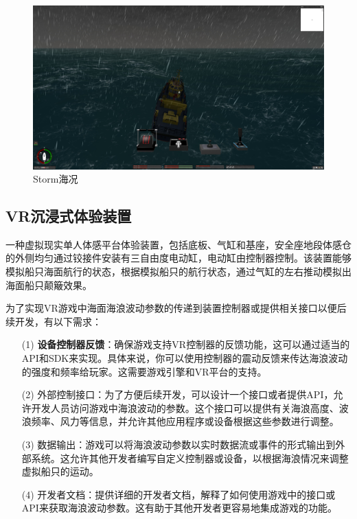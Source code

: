 \documentclass[a4paper,10pt]{article}
\begin{document}
		\begin{figure}[htbp]
			\centering				\includegraphics[width=\columnwidth]{picture/Storm}
			\caption{
				\label{fig: Storm1} 
				Storm海况
			}	
		\end{figure}
		
		\subsection{VR沉浸式体验装置}
		
		一种虚拟现实单人体感平台体验装置，包括底板、气缸和基座，安全座地段体感仓的外侧均匀通过铰接件安装有三自由度电动缸，电动缸由控制器控制。该装置能够模拟船只海面航行的状态，根据模拟船只的航行状态，通过气缸的左右推动模拟出海面船只颠簸效果。
		
		为了实现VR游戏中海面海浪波动参数的传递到装置控制器或提供相关接口以便后续开发，有以下需求：
		
		
		\begin{itemize}
			\item[(1)] 
			\textbf{设备控制器反馈}：确保游戏支持VR控制器的反馈功能，这可以通过适当的API和SDK来实现。具体来说，你可以使用控制器的震动反馈来传达海浪波动的强度和频率给玩家。这需要游戏引擎和VR平台的支持。
			
			\item[(2)]
			外部控制接口：为了方便后续开发，可以设计一个接口或者提供API，允许开发人员访问游戏中海浪波动的参数。这个接口可以提供有关海浪高度、波浪频率、风力等信息，并允许其他应用程序或设备根据这些参数进行调整。
			
			\item[(3)]
			数据输出：游戏可以将海浪波动参数以实时数据流或事件的形式输出到外部系统。这允许其他开发者编写自定义控制器或设备，以根据海浪情况来调整虚拟船只的运动。
			
			\item[(4)]
			开发者文档：提供详细的开发者文档，解释了如何使用游戏中的接口或API来获取海浪波动参数。这有助于其他开发者更容易地集成游戏的功能。
			
		\end{itemize}	
		
\end{document}

